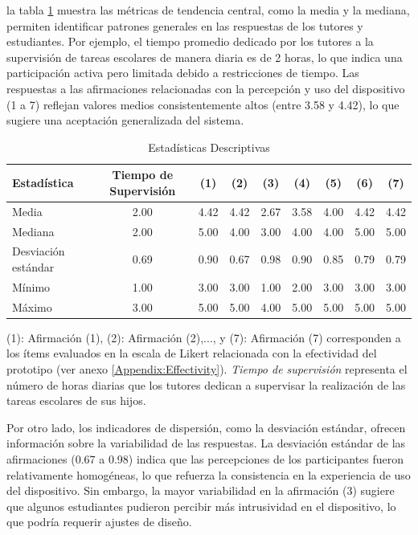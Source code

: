 \documentclass[a4paper,fleqn]{cas-sc}
\begin{document}
				la tabla \ref{table:DescriptiveStatistics} muestra las métricas de tendencia central, como la media y la mediana, permiten identificar patrones generales en las respuestas de los tutores y estudiantes. Por ejemplo, el tiempo promedio dedicado por los tutores a la supervisión de tareas escolares de manera diaria es de 2 horas, lo que indica una participación activa pero limitada debido a restricciones de tiempo. Las respuestas a las afirmaciones relacionadas con la percepción y uso del dispositivo (1 a 7) reflejan valores medios consistentemente altos (entre 3.58 y 4.42), lo que sugiere una aceptación generalizada del sistema.
				
				\begin{table}[h!]
					\centering
					\caption{Estadísticas Descriptivas}
					\begin{tabularx}{0.85\textwidth}{Xcccccccc}
						\toprule
						\textbf{Estadística} & \textbf{Tiempo de Supervisión} & \textbf{(1)} & \textbf{(2)} & \textbf{(3)} & \textbf{(4)} & \textbf{(5)} & \textbf{(6)} & \textbf{(7)} \\
						\midrule
						Media & 2.00 & 4.42 & 4.42 & 2.67 & 3.58 & 4.00 & 4.42 & 4.42 \\
						Mediana & 2.00 & 5.00 & 4.00 & 3.00 & 4.00 & 4.00 & 5.00 & 5.00 \\
						Desviación estándar & 0.69 & 0.90 & 0.67 & 0.98 & 0.90 & 0.85 & 0.79 & 0.79 \\
						Mínimo & 1.00 & 3.00 & 3.00 & 1.00 & 2.00 & 3.00 & 3.00 & 3.00 \\
						Máximo & 3.00 & 5.00 & 5.00 & 4.00 & 5.00 & 5.00 & 5.00 & 5.00 \\
						\bottomrule
					\end{tabularx}
					\label{table:DescriptiveStatistics}
					\vspace{0.3em} %
					\parbox{0.85\textwidth}{\footnotesize
						(1): Afirmación (1), (2): Afirmación (2),..., y (7): Afirmación (7) corresponden a los ítems evaluados en la escala de Likert relacionada con la efectividad del prototipo (ver anexo \ref{Appendix:Effectivity}). \textit{Tiempo de supervisión} representa el número de horas diarias que los tutores dedican a supervisar la realización de las tareas escolares de sus hijos.
					}
				\end{table}
				
				Por otro lado, los indicadores de dispersión, como la desviación estándar, ofrecen información sobre la variabilidad de las respuestas. La desviación estándar de las afirmaciones (0.67 a 0.98) indica que las percepciones de los participantes fueron relativamente homogéneas, lo que refuerza la consistencia en la experiencia de uso del dispositivo. Sin embargo, la mayor variabilidad en la afirmación (3) sugiere que algunos estudiantes pudieron percibir más intrusividad en el dispositivo, lo que podría requerir ajustes de diseño.
				
\end{document}
